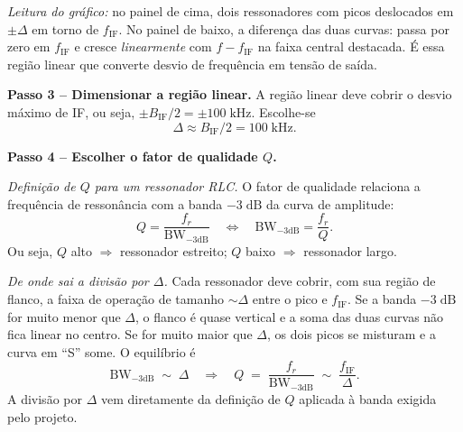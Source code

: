 \documentclass[11pt,a4paper]{article}
\begin{document}
\begin{resolucao}
\begin{center}
\end{center}

\emph{Leitura do gráfico:} no painel de cima, dois ressonadores com picos deslocados em $\pm\Delta$ em torno de $f_{\text{IF}}$. No painel de baixo, a diferença das duas curvas: passa por zero em $f_{\text{IF}}$ e cresce \emph{linearmente} com $f - f_{\text{IF}}$ na faixa central destacada. É essa região linear que converte desvio de frequência em tensão de saída.

\textbf{Passo 3 -- Dimensionar a região linear.} A região linear deve cobrir o desvio máximo de IF, ou seja, $\pm B_{\text{IF}}/2 = \pm 100\;\text{kHz}$. Escolhe-se
\[
  \Delta \approx B_{\text{IF}}/2 = 100\;\text{kHz}.
\]

\textbf{Passo 4 -- Escolher o fator de qualidade $Q$.}

\emph{Definição de $Q$ para um ressonador RLC.} O fator de qualidade relaciona a frequência de ressonância com a banda $-3\;\text{dB}$ da curva de amplitude:
\[
  Q = \frac{f_r}{\text{BW}_{-3\text{dB}}} \quad\Longleftrightarrow\quad \text{BW}_{-3\text{dB}} = \frac{f_r}{Q}.
\]
Ou seja, $Q$ alto $\Rightarrow$ ressonador estreito; $Q$ baixo $\Rightarrow$ ressonador largo.

\emph{De onde sai a divisão por $\Delta$.} Cada ressonador deve cobrir, com sua região de flanco, a faixa de operação de tamanho $\sim \Delta$ entre o pico e $f_{\text{IF}}$. Se a banda $-3\;\text{dB}$ for muito menor que $\Delta$, o flanco é quase vertical e a soma das duas curvas não fica linear no centro. Se for muito maior que $\Delta$, os dois picos se misturam e a curva em ``S'' some. O equilíbrio é
\[
  \text{BW}_{-3\text{dB}} \;\sim\; \Delta
  \quad\Longrightarrow\quad
  Q \;=\; \frac{f_r}{\text{BW}_{-3\text{dB}}} \;\sim\; \frac{f_{\text{IF}}}{\Delta}.
\]
A divisão por $\Delta$ vem diretamente da definição de $Q$ aplicada à banda exigida pelo projeto.


\end{resolucao}
\end{document}
